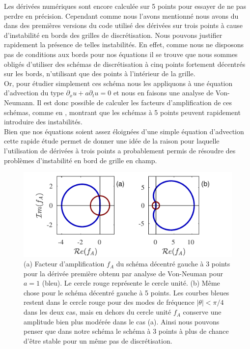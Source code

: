 \documentclass[10pt]{article}
\begin{document}
\begin{multicols}{2}
Les dérivées numériques sont encore calculée sur 5 points pour essayer de ne pas perdre en précision. Cependant comme nous l'avons mentionné nous avons du dans des premières versions du code utilisé des dérivées sur trois points à cause d'instabilité en bords des grilles de discrétisation. Nous pouvons justifier rapidement la présence de telles instabilités. En effet, comme nous ne disposons pas de conditions aux bords pour nos équations il se trouve que nous sommes obligés d'utiliser des schémas de discrétisation à cinq points fortement décentrés sur les bords, n'utilisant que des points à l'intérieur de la grille.\\


Or, pour étudier simplement ces schéma nous les appliquons à une équation d'advection du type $\partial_x u + a \partial_t u = 0$ et nous en faisons une analyse de Von-Neumann. Il est donc possible de calculer les facteurs d'amplification de ces schémas, comme en , montrant que les schémas à 5 points peuvent rapidement introduire des instabilités.\\

Bien que nos équations soient assez éloignées d'une simple équation d'advection cette rapide étude permet de donner une idée de la raison pour laquelle l'utilisation de dérivées à trois points a probablement permis de résoudre des problèmes d'instabilité en bord de grille en champ.

\begin{figure}[H]
\begin{center}
	\includegraphics[width=0.95\columnwidth]{FacAmp.pdf}
\end{center}
\caption{(a) Facteur d'amplification $f_A$ du schéma décentré gauche à 3 points pour la dérivée première obtenu par analyse de Von-Neuman pour $a=1$ (bleu). Le cercle rouge représente le cercle unité. (b) Même chose pour le schéma décentré gauche à 5 points. Les courbes bleues restent dans le cercle rouge pour des modes de fréquence $|\theta| < \pi/4$ dans les deux cas, mais en dehors du cercle unité $f_A$ conserve une amplitude bien plus modérée dans le cas (a). Ainsi nous pouvons penser que dans notre schéma le schéma à 3 points à plus de chance d'être stable pour un même pas de discrétisation.}
\label{fig:FacAmp}
\end{figure}


\end{multicols}
\end{document}
